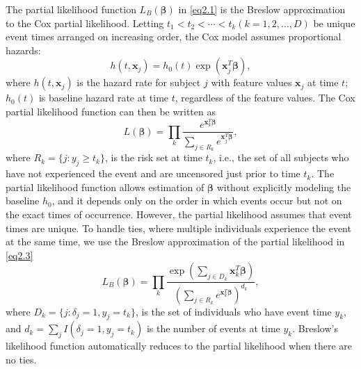 The partial likelihood function $L_B(\bm{\beta})$ in \eqref{eq2.1} is the Breslow approximation \citep{breslow1972contribution} to the Cox partial likelihood. Letting $t_1<t_2<\cdots<t_k (k=1,2,\dots,D)$ be unique event times arranged on increasing order, the Cox model assumes proportional hazards: 
\begin{equation}
    h(t,\bm{x}_j)=h_0(t)\exp{(\bm{x}_j^T\bm{\beta})}, \label{eq2.2} 
\end{equation}
where $h(t,\bm{x}_j)$ is the hazard rate for subject $j$ with feature values $\bm{x}_j$ at time $t$; $h_0(t)$ is baseline hazard rate at time $t$, regardless of the feature values. The Cox partial likelihood function \citep{cox1972regression} can then be written as
\begin{equation}
    L(\bm{\beta})=\prod_k \frac{e^{\bm{x}_k^T\bm{\beta}}}{\sum_{j\in R_k}e^{\bm{x}_j^T\bm{\beta}}}, \label{eq2.3}
\end{equation}
where $R_k=\{j:y_j\geq t_k\}$, is the risk set at time $t_k$, i.e., the set of all subjects who have not experienced the event and are uncensored just prior to time $t_k$. The partial likelihood function allows estimation of $\bm{\beta}$ without explicitly modeling the baseline $h_0$, and it depends only on the order in which events occur but not on the exact times of occurrence. However, the partial likelihood assumes that event times are unique. To handle ties, where multiple individuals experience the event at the same time, we use the Breslow approximation of the partial likelihood in \eqref{eq2.3}
\begin{equation}
    L_B(\bm{\beta})=\prod_k \frac{\exp{(\sum_{j\in D_k}\bm{x}_k^T\bm{\beta})}}{(\sum_{j\in R_k}e^{\bm{x}_k^T\bm{\beta}})^{d_k}}, \label{eq2.4}
\end{equation}
where $D_k=\{j:\delta_j=1,y_j=t_k\}$, is the set of individuals who have event time $y_k$, and $d_k=\sum_jI(\delta_j=1,y_j=t_k)$ is the number of events at time $y_k$. Breslow’s likelihood function automatically reduces to the partial likelihood when there are no ties. 

